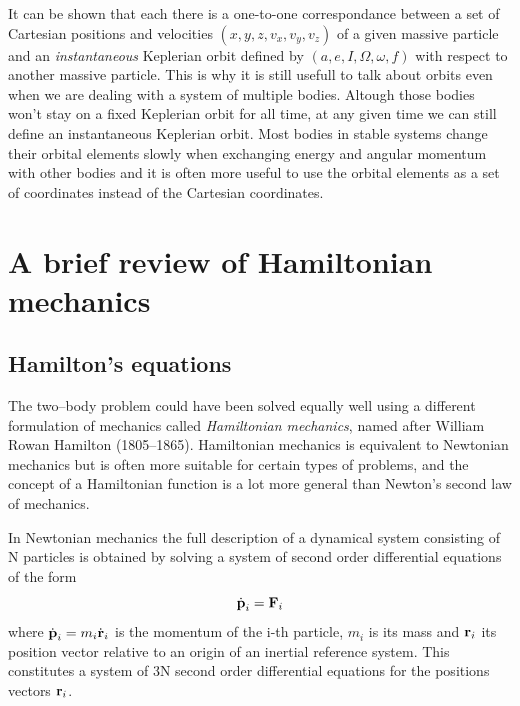 \documentclass[ twoside,openright,titlepage,numbers=noenddot,headinclude,%
                footinclude=true,cleardoublepage=empty,abstractoff, %
                BCOR=5mm,paper=a4,fontsize=11pt,%
                american,%
                ]{scrreprt}
\begin{document}
It can be shown that each there is a one-to-one correspondance between 
a set of Cartesian positions and velocities $(x,y,z,v_x,v_y,v_z)$ 
of a given massive particle and an \emph{instantaneous} Keplerian orbit 
defined by $(a,e,I,\Omega,\omega,f)$ with respect to another massive
particle. This is why it is still usefull to talk about orbits even
when we are dealing with a system of multiple bodies. Altough those
bodies won't stay on a fixed Keplerian orbit for all time, at any given
time we can still define an instantaneous Keplerian orbit.
Most bodies in stable systems change their orbital elements slowly
when exchanging energy and angular momentum with other bodies and
it is often more useful to use the orbital elements as a set of coordinates
instead of the Cartesian coordinates.

\section{A brief review of Hamiltonian mechanics}
\label{sec:hamiltonian_mechanics}
\subsection{Hamilton's equations}
\label{sub:Hamilton's equations}
The two--body problem could have been solved equally well using a different
formulation of mechanics called \emph{Hamiltonian mechanics}, named after
William Rowan Hamilton (1805--1865). Hamiltonian
mechanics is equivalent to Newtonian mechanics but is often more suitable
for certain types of problems, and the concept of a Hamiltonian function
is a lot more general than Newton's second law of mechanics.

In Newtonian mechanics the full description of a dynamical system 
consisting of N particles is 
obtained by solving a system of second order differential equations
of the form
\begin{equation}
    \dot{\boldsymbol{\mathbf{p}}}_i=\boldsymbol{\mathbf{F}}_i
\end{equation}
where $\dot{\boldsymbol{\mathbf{p}}}_i=m_i\dot{\boldsymbol{\mathbf{r}}}_i$ is the momentum of the
i-th particle, $m_i$ is its mass and $\boldsymbol{\mathbf{r}}_i$ its position vector
relative to an origin of an inertial reference system. This 
constitutes a system of 3N second order differential equations for
the positions vectors $\boldsymbol{\mathbf{r}}_i$.
\end{document}
